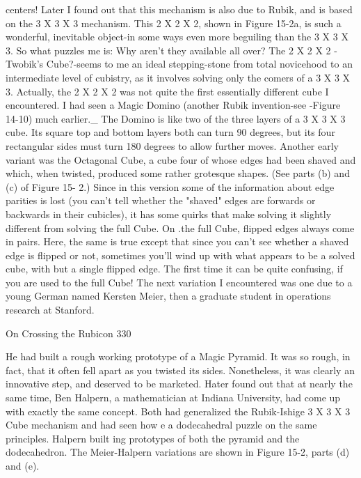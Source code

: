 centers! Later I found out that this mechanism is also due to Rubik, and is based on
the 3 X 3 X 3 mechanism. This 2 X 2 X 2, shown in Figure 15-2a, is such a
wonderful, inevitable object-in some ways even more beguiling than the 3 X 3 X 3.
So what puzzles me is: Why aren't they available all over? The 2 X 2 X 2 -Twobik's
Cube?-seems to me an ideal stepping-stone from total novicehood to an intermediate
level of cubistry, as it involves solving only the comers of a 3 X 3 X 3.
        Actually, the 2 X 2 X 2 was not quite the first essentially different cube I
encountered. I had seen a Magic Domino (another Rubik invention-see -Figure 14-10)
much earlier.\_ The Domino is like two of the three layers of a 3 X 3 X 3 cube. Its
square top and bottom layers both can turn 90 degrees, but its four rectangular sides
must turn 180 degrees to allow further moves. Another early variant was the
Octagonal Cube, a cube four of whose edges had been shaved and which, when
twisted, produced some rather grotesque shapes. (See parts (b) and (c) of Figure 15-
2.) Since in this version some of the information about edge parities is lost (you can't
tell whether the "shaved" edges are forwards or backwards in their cubicles), it has
some quirks that make solving it slightly different from solving the full Cube. On .the
full Cube, flipped edges always come in pairs. Here, the same is true except that since
you can't see whether a shaved edge is flipped or not, sometimes you'll wind up with
what appears to be a solved cube, with but a single flipped edge. The first time it can
be quite confusing, if you are used to the full Cube!
        The next variation I encountered was one due to a young German named
Kersten Meier, then a graduate student in operations research at Stanford.




On Crossing the Rubicon                                                             330

He had built a rough working prototype of a Magic Pyramid. It was so rough, in fact,
that it often fell apart as you twisted its sides. Nonetheless, it was clearly an
innovative step, and deserved to be marketed. Hater found out that at nearly the same
time, Ben Halpern, a mathematician at Indiana University, had come up with exactly
the same concept. Both had generalized the Rubik-Ishige 3 X 3 X 3 Cube mechanism
and had seen how e a dodecahedral puzzle on the same principles. Halpern built
ing prototypes of both the pyramid and the dodecahedron. The Meier-Halpern
variations are shown in Figure 15-2, parts (d) and (e).

